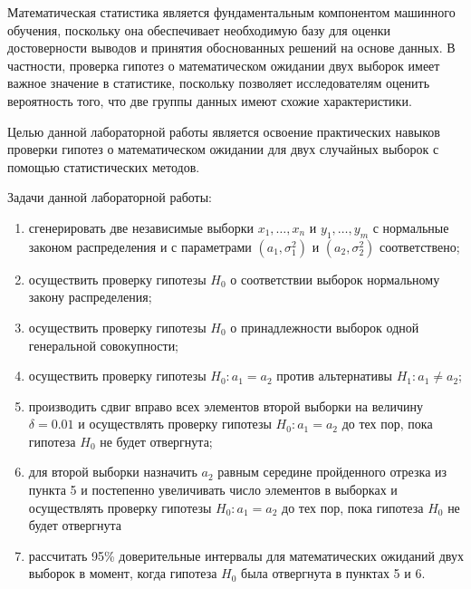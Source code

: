 
Математическая статистика является фундаментальным компонентом машинного 
обучения, поскольку она обеспечивает необходимую базу для оценки 
достоверности выводов и принятия обоснованных решений на основе данных. В 
частности, проверка гипотез о математическом ожидании двух выборок имеет 
важное значение в статистике, поскольку позволяет исследователям оценить 
вероятность того, что две группы данных имеют схожие характеристики.

Целью данной лабораторной работы является освоение практических навыков 
проверки гипотез о математическом ожидании для двух случайных выборок с 
помощью статистических методов.

Задачи данной лабораторной работы:
\begin{enumerate}[label*=\arabic*)]
	\item сгенерировать две независимые выборки $x_1,…,x_n$ и $y_1,…,y_m$ с нормальные законом распределения и с параметрами  $(a_1,\sigma_1^2 )$ и $(a_2,\sigma_2^2 )$  соответствено;
	\item осуществить проверку гипотезы $H_0$ о соответствии выборок нормальному закону распределения; 
	\item осуществить проверку гипотезы $H_0$ о принадлежности выборок одной генеральной совокупности;
	\item осуществить проверку гипотезы $H_0: a_1 = a_2$ против альтернативы $H_1: a_1 \neq a_2$;
	\item производить сдвиг вправо всех элементов второй выборки на величину $\delta=0.01$ и осуществлять проверку гипотезы $H_0: a_1= a_2$ до тех пор, пока гипотеза $H_0$ не будет отвергнута;
	\item для второй выборки назначить $a_2$ равным середине пройденного отрезка из пункта 5 и постепенно увеличивать число элементов в выборках и осуществлять проверку гипотезы $H_0: a_1= a_2$ до тех пор, пока гипотеза $H_0$ не будет отвергнута
	\item рассчитать 95\% доверительные интервалы для математических ожиданий двух выборок в момент, когда гипотеза $H_0$ была отвергнута в пунктах 5 и 6.
\end{enumerate}

\clearpage
